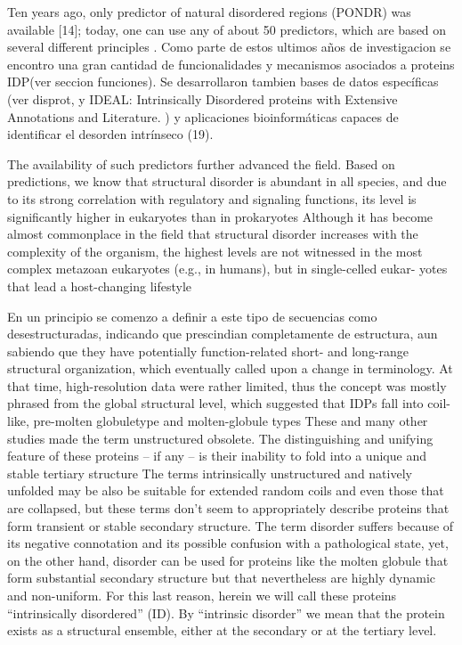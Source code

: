 Ten years ago, only predictor of natural disordered regions (PONDR) was available [14]; today, one can use any of about 50 predictors, which are based on several different principles \cite{he2009predicting}.
Como parte de estos ultimos años de investigacion se encontro una gran cantidad de funcionalidades y mecanismos asociados a proteins IDP(ver seccion funciones).
Se desarrollaron tambien bases de datos específicas (ver disprot, y IDEAL: Intrinsically Disordered proteins with Extensive Annotations and Literature. ) y aplicaciones bioinformáticas capaces de identificar el desorden intrínseco (19).

The availability of such predictors further advanced the field.
Based on predictions, we know that structural disorder is abundant in all species, and due to its strong correlation with regulatory and signaling functions, its level is significantly higher in eukaryotes than in prokaryotes
Although it has become almost commonplace in the field that structural disorder increases with the complexity of the organism, the highest levels are not witnessed in the most complex metazoan eukaryotes (e.g., in humans), but in single-celled eukar-
yotes that lead a host-changing lifestyle

En un principio se comenzo a definir a este tipo de secuencias como desestructuradas, indicando que prescindian completamente de estructura, aun sabiendo que they have potentially function-related
short- and long-range structural organization, which eventually called upon a change in terminology.
At that time, high-resolution data were rather limited, thus the concept was mostly phrased from the global structural level, which suggested that IDPs fall into coil-like, pre-molten globuletype and molten-globule types
These and many other studies made the term unstructured obsolete. 
The distinguishing and unifying feature of these proteins – if any – is their inability to fold into a unique and stable tertiary structure
The terms intrinsically unstructured and natively unfolded may be also be suitable for extended random coils and even those that are collapsed, but these terms don't seem to appropriately describe proteins that form transient or
stable secondary structure. The term disorder suffers because of its negative connotation and its possible confusion with a pathological state, yet, on the other hand, disorder can be used for proteins like the molten globule that form substantial secondary structure but that
nevertheless are highly dynamic and non-uniform. For this last reason, herein we will call these proteins “intrinsically disordered” (ID).
By “intrinsic disorder” we mean that the protein exists as a structural ensemble, either at the secondary or at the tertiary level.

